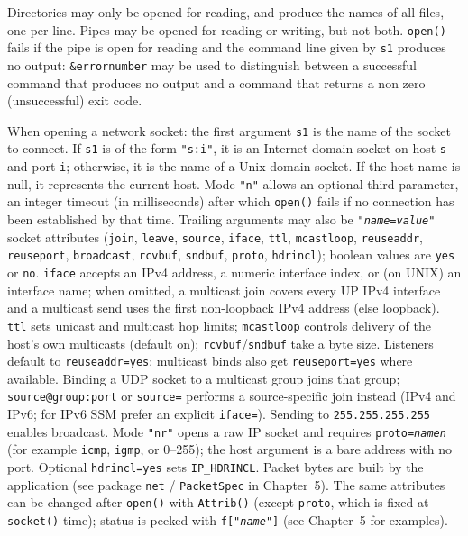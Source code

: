 Directories may only be opened for reading, and produce the names of all
files, one per line. Pipes may be opened for reading or writing, but
not both. \texttt{open()} fails if the pipe is open for reading and
the command line given by \texttt{s1} produces no output:
\texttt{\&errornumber} may be used to distinguish between a successful
command that produces no output and a command that returns a non zero
(unsuccessful) exit code.

When opening a network socket: the first argument \texttt{s1} is the
name of the socket to connect. If \texttt{s1} is of the form
\texttt{"s:i"}, it is an Internet domain socket on
host \texttt{s} and port \texttt{i}; otherwise, it is the name of a Unix
domain socket. If the host name is null, it represents the current
host. Mode \texttt{"n"} allows an optional third parameter,
an integer timeout (in milliseconds) after which \texttt{open()} fails
if no connection has been established by that time.
Trailing arguments may also be \texttt{"\textit{name}=\textit{value}"}
socket attributes (\texttt{join}, \texttt{leave}, \texttt{source},
\texttt{iface}, \texttt{ttl}, \texttt{mcastloop},
\texttt{reuseaddr}, \texttt{reuseport}, \texttt{broadcast},
\texttt{rcvbuf}, \texttt{sndbuf}, \texttt{proto}, \texttt{hdrincl});
boolean values are \texttt{yes} or \texttt{no}. \texttt{iface}
accepts an IPv4 address, a numeric interface index, or (on UNIX) an
interface name; when omitted, a multicast join covers every UP IPv4
interface and a multicast send uses the first non-loopback IPv4
address (else loopback). \texttt{ttl} sets unicast and multicast hop
limits; \texttt{mcastloop} controls delivery of the host's own
multicasts (default on); \texttt{rcvbuf}/\texttt{sndbuf} take a byte
size. Listeners default to \texttt{reuseaddr=yes}; multicast binds
also get \texttt{reuseport=yes} where available. Binding a UDP socket
to a multicast group joins that group; \texttt{source@group:port} or
\texttt{source=} performs a source-specific join instead (IPv4 and
IPv6; for IPv6 SSM prefer an explicit \texttt{iface=}). Sending to
\texttt{255.255.255.255} enables broadcast.
Mode \texttt{"nr"} opens a raw IP socket and requires
\texttt{proto=\textit{name{\textbar}n}} (for example \texttt{icmp},
\texttt{igmp}, or 0--255); the host argument is a bare address with
no port. Optional \texttt{hdrincl=yes} sets \texttt{IP\_HDRINCL}.
Packet bytes are built by the application (see package \texttt{net}
/ \texttt{PacketSpec} in Chapter~5). The same attributes can be
changed after \texttt{open()} with \texttt{Attrib()} (except
\texttt{proto}, which is fixed at \texttt{socket()} time); status is
peeked with \texttt{f["\textit{name}"]} (see
Chapter~5 for examples).

